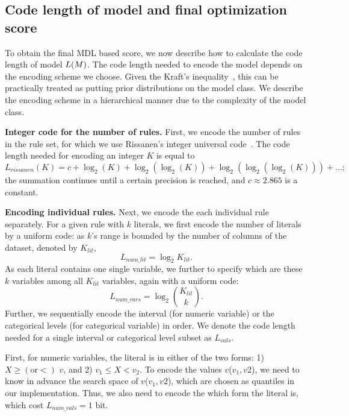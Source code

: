  \subsection{Code length of model and final optimization score}
To obtain the final MDL based score, we now describe how to calculate the code length of model $L(M)$. The code length needed to encode the model depends on the encoding scheme we choose. Given the Kraft's inequality~\citep{grunwald2007minimum}, this can be practically treated as putting prior distributions on the model class. We describe the encoding scheme in a hierarchical manner due to the complexity of the model class. 

\noindent \textbf{Integer code for the number of rules.} 
First, we encode the number of rules in the rule set, for which we use Rissanen's integer universal code~\citep{rissanen1983universal}. The code length needed for encoding an integer $K$ is equal to 
$$L_{rissanen}(K) = c + \log_2(K) + \log_2(\log_2(K)) + \log_2(\log_2(\log_2(K))) + \ldots ;$$
the summation continues until a certain precision is reached, and $c \approx 2.865$ is a constant. 

\noindent \textbf{Encoding individual rules.} 
Next, we encode the each individual rule separately. For a given rule with $k$ literals, we first encode the number of literals by a uniform code: as $k$'s range is bounded by the number of columns of the dataset, denoted by $K_{lit}$, 
\begin{equation}
	L_{num\_lit} = \log_2 K_{lit}. 
\end{equation}
As each literal contains one single variable, we further to specify which are these $k$ variables among all $K_{lit}$ variables, again with a uniform code:
\begin{equation}
	L_{num\_vars} = \log_2 {K_{lit} \choose k}. 
\end{equation}
Further, we sequentially encode the interval (for numeric variable) or the categorical levels (for categorical variable) in order. We denote the code length needed for a single interval or categorical level subset as $L_{vals}$.  

First, for numeric variables, the literal is in either of the two forms: 1) $X \geq (\text{or} <)$ $v$, and 2) $v_1  \leq X < v_2$. To encode the values $v$($v_1, v2$), we need to know in advance the search space of $v$($v_1, v2$), which are chosen as quantiles in our implementation. Thus, we also need to encode the which form the literal is, which cost $L_{num\_vals} = 1$ bit. 

